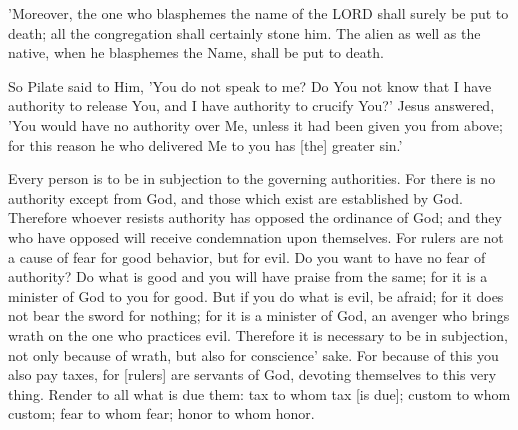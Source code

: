 \vspace{2\baselineskip}

\begin{scripture}[Leviticus 24:16]
    'Moreover, the one who blasphemes the name of the LORD shall surely be put to death; all the congregation shall certainly stone him. The alien as well as the native, when he blasphemes the Name, shall be put to death.
\end{scripture}

\vspace{2\baselineskip}

\begin{scripture}[John 19:10-11]
    So Pilate said to Him, 'You do not speak to me? Do You not know that I have authority to release You, and I have authority to crucify You?'
    Jesus answered, 'You would have no authority over Me, unless it had been given you from above; for this reason he who delivered Me to you has [the] greater sin.'
\end{scripture}

\vspace{2\baselineskip}

\begin{scripture}[Romans 13:1-7]
    Every person is to be in subjection to the governing authorities. For there is no authority except from God, and those which exist are established by God.
    Therefore whoever resists authority has opposed the ordinance of God; and they who have opposed will receive condemnation upon themselves.
    For rulers are not a cause of fear for good behavior, but for evil. Do you want to have no fear of authority? Do what is good and you will have praise from the same;
    for it is a minister of God to you for good. But if you do what is evil, be afraid; for it does not bear the sword for nothing; for it is a minister of God, an avenger who brings wrath on the one who practices evil.
    Therefore it is necessary to be in subjection, not only because of wrath, but also for conscience' sake.
    For because of this you also pay taxes, for [rulers] are servants of God, devoting themselves to this very thing.
    Render to all what is due them: tax to whom tax [is due]; custom to whom custom; fear to whom fear; honor to whom honor.
\end{scripture}

\vspace{6\baselineskip}

